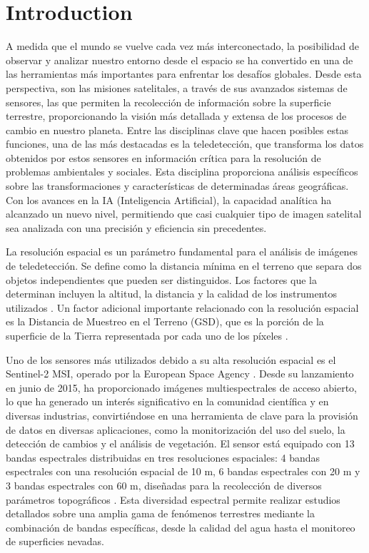 \chapter{Introduction}

A medida que el mundo se vuelve cada vez más interconectado, la posibilidad de observar y analizar nuestro entorno desde el espacio se ha convertido en una de las herramientas más importantes para enfrentar los desafíos globales. Desde esta perspectiva, son las misiones satelitales, a través de sus avanzados sistemas de sensores, las que permiten la recolección de información sobre la superficie terrestre, proporcionando la visión más detallada y extensa de los procesos de cambio en nuestro planeta. Entre las disciplinas clave que hacen posibles estas funciones, una de las más destacadas es la teledetección, que transforma los datos obtenidos por estos sensores en información crítica para la resolución de problemas ambientales y sociales. Esta disciplina proporciona análisis específicos sobre las transformaciones y características de determinadas áreas geográficas. Con los avances en la  IA (Inteligencia Artificial), la capacidad analítica ha alcanzado un nuevo nivel, permitiendo que casi cualquier tipo de imagen satelital sea analizada con una precisión y eficiencia sin precedentes.

La resolución espacial es un parámetro fundamental para el análisis de imágenes de teledetección. Se define como la distancia mínima en el terreno que separa dos objetos independientes que pueden ser distinguidos. Los factores que la determinan incluyen la altitud, la distancia y la calidad de los instrumentos utilizados \autocite{alparone2015remote}. Un factor adicional importante relacionado con la resolución espacial es la Distancia de Muestreo en el Terreno (GSD), que es la porción de la superficie de la Tierra representada por cada uno de los píxeles \autocite{lillesand2015remote}.

Uno de los sensores más utilizados debido a su alta resolución espacial es el Sentinel-2 MSI, operado por la European Space Agency \autocite{Sentinel2_Handbook}. Desde su lanzamiento en junio de 2015, ha proporcionado imágenes multiespectrales de acceso abierto, lo que ha generado un interés significativo en la comunidad científica y en diversas industrias, convirtiéndose en una herramienta de clave para la provisión de datos en diversas aplicaciones, como la monitorización del uso del suelo, la detección de cambios y el análisis de vegetación. El sensor está equipado con 13 bandas espectrales distribuidas en tres resoluciones espaciales: 4 bandas espectrales con una resolución espacial de 10 m, 6 bandas espectrales con 20 m y 3 bandas espectrales con 60 m, diseñadas para la recolección de diversos parámetros topográficos \autocite{lanaras2018super}. Esta diversidad espectral permite realizar estudios detallados sobre una amplia gama de fenómenos terrestres mediante la combinación de bandas específicas, desde la calidad del agua hasta el monitoreo de superficies nevadas.


